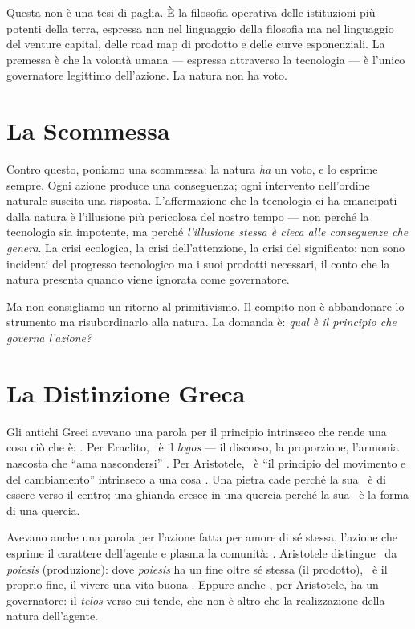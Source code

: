 Questa non \`e una tesi di paglia. \`E la filosofia operativa delle
istituzioni pi\`u potenti della terra, espressa non nel linguaggio della
filosofia ma nel linguaggio del venture capital, delle road map di prodotto
e delle curve esponenziali. La premessa \`e che la volont\`a umana ---
espressa attraverso la tecnologia --- \`e l'unico governatore legittimo
dell'azione. La natura non ha voto.

\section{La Scommessa}

Contro questo, poniamo una scommessa: la natura \emph{ha} un voto, e lo
esprime sempre. Ogni azione produce una conseguenza; ogni intervento
nell'ordine naturale suscita una risposta. L'affermazione che la tecnologia
ci ha emancipati dalla natura \`e l'illusione pi\`u pericolosa del nostro
tempo --- non perch\'e la tecnologia sia impotente, ma perch\'e
\emph{l'illusione stessa \`e cieca alle conseguenze che genera}. La crisi
ecologica, la crisi dell'attenzione, la crisi del significato: non sono
incidenti del progresso tecnologico ma i suoi prodotti necessari, il conto
che la natura presenta quando viene ignorata come governatore.

Ma non consigliamo un ritorno al primitivismo. Il compito non \`e
abbandonare lo strumento ma risubordinarlo alla natura. La domanda \`e:
\emph{qual \`e il principio che governa l'azione?}

\section{La Distinzione Greca}

Gli antichi Greci avevano una parola per il principio intrinseco che rende
una cosa ci\`o che \`e: \physis. Per Eraclito, \physis\ \`e il \emph{logos}
--- il discorso, la proporzione, l'armonia nascosta che ``ama nascondersi''
\parencite{kirk1983presocratic}. Per
Aristotele, \physis\ \`e ``il principio del movimento e del cambiamento''
intrinseco a una cosa \parencite[II.1]{aristotle1984physics}. Una pietra cade
perch\'e la sua \physis\ \`e di essere verso il centro; una ghianda cresce
in una quercia perch\'e la sua \physis\ \`e la forma di una quercia.

Avevano anche una parola per l'azione fatta per amore di s\'e stessa,
l'azione che esprime il carattere dell'agente e plasma la comunit\`a:
\praxis. Aristotele distingue \praxis\ da \emph{poiesis} (produzione):
dove \emph{poiesis} ha un fine oltre s\'e stessa (il prodotto), \praxis\
\`e il proprio fine, il vivere una vita buona \parencite[VI.4]{aristotle2000ethics}.
Eppure anche \praxis, per Aristotele, ha un governatore: il \emph{telos}
verso cui tende, che non \`e altro che la realizzazione della natura
dell'agente.

